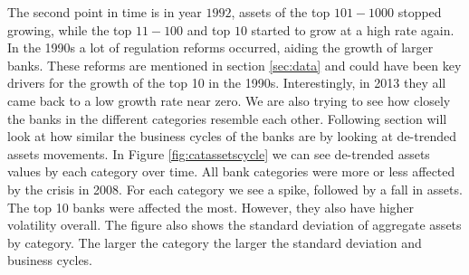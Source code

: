 \documentclass[12pt, a4paper]{article} %
\begin{document}
The second point in time is in year $1992$, assets of the top $101-1000$ stopped growing, while the top $11-100$ and top $10$ started to grow at a high rate again. In the 1990s a lot of regulation reforms occurred, aiding the growth of larger banks. These reforms are mentioned in section \ref{sec:data} and could have been key drivers for the growth of the top 10 in the 1990s. Interestingly, in 2013 they all came back to a low growth rate near zero.
\fi
We are also trying to see how closely the banks in the different categories resemble each other. Following section will look at how similar the business cycles of the banks are by looking at de-trended assets movements. 
In Figure \ref{fig:catassetscycle} we can see de-trended assets values by each category over time. All bank categories were more or less affected by the crisis in 2008. For each category we see a spike, followed by a fall in assets. The top 10 banks were affected the most. However, they also have higher volatility overall. The figure also shows the standard deviation of aggregate assets by category. The larger the category the larger the standard deviation and business cycles.
\end{document}

